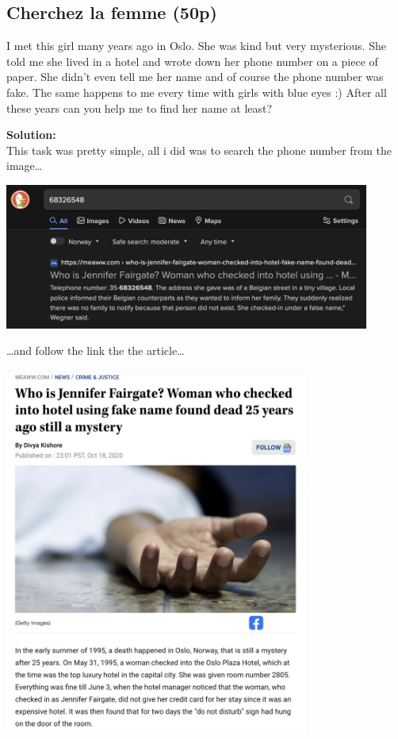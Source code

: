 \subsection{Cherchez la femme (50p)}
I met this girl many years ago in Oslo. She was kind but very mysterious. She told me she lived in a hotel and wrote down her phone number on a piece of paper. She didn't even tell me her name and of course the phone number was fake. The same happens to me every time with girls with blue eyes :) After all these years can you help me to find her name at least?

\textbf{Solution:}\\
This task was pretty simple, all i did was to search the phone number from the image\dots

\includegraphics[width=12cm]{img/OSINT/Cherchez la femme/Skjermbilde 2023-08-28 kl. 11.55.32.png}

\dots and follow the link the the article\dots

\includegraphics[width=10cm]{img/OSINT/Cherchez la femme/Skjermbilde 2023-08-28 kl. 11.56.40.png}

